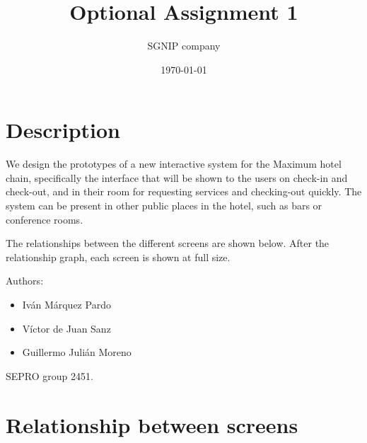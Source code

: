 \documentclass{article}
\title{Optional Assignment 1}
\date{\today}
\author{SGNIP company}
\begin{document}
\maketitle

\section{Description}

We design the prototypes of a new interactive system for the Maximum hotel chain, specifically the interface that will be shown to the users on check-in and check-out, and in their room for requesting services and checking-out quickly. The system can be present in other public places in the hotel, such as bars or conference rooms.

The relationships between the different screens are shown below. After the relationship graph, each screen is shown at full size.

Authors: \begin{itemize}
\item Iv\'an M\'arquez Pardo
\item V\'ictor de Juan Sanz
\item Guillermo Juli\'an Moreno
\end{itemize}

SEPRO group 2451.

\newpage
\section{Relationship between screens}
\end{document}
